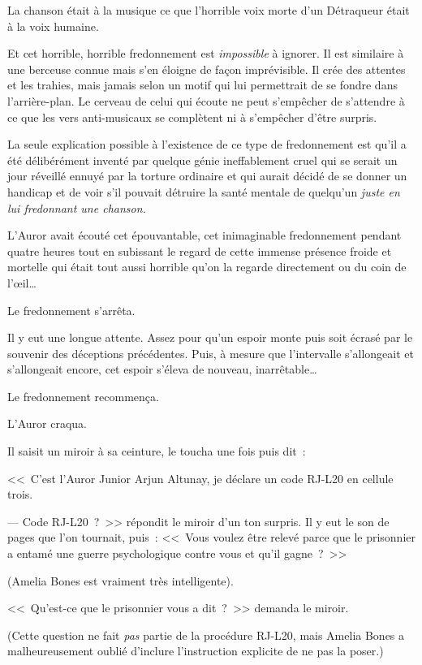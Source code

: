 La chanson était à la musique ce que l'horrible voix morte d'un Détraqueur était à la voix humaine.

Et cet horrible, horrible fredonnement est \emph{impossible} à ignorer. Il est similaire à une berceuse connue mais s'en éloigne de façon imprévisible. Il crée des attentes et les trahies, mais jamais selon un motif qui lui permettrait de se fondre dans l'arrière-plan. Le cerveau de celui qui écoute ne peut s'empêcher de s'attendre à ce que les vers anti-musicaux se complètent ni à s'empêcher d'être surpris.

La seule explication possible à l'existence de ce type de fredonnement est qu'il a été délibérément inventé par quelque génie ineffablement cruel qui se serait un jour réveillé ennuyé par la torture ordinaire et qui aurait décidé de se donner un handicap et de voir s'il pouvait détruire la santé mentale de quelqu'un \emph{juste en lui fredonnant une chanson.}

L'Auror avait écouté cet épouvantable, cet inimaginable fredonnement pendant quatre heures tout en subissant le regard de cette immense présence froide et mortelle qui était tout aussi horrible qu'on la regarde directement ou du coin de l'œil…

Le fredonnement s'arrêta.

Il y eut une longue attente. Assez pour qu'un espoir monte puis soit écrasé par le souvenir des déceptions précédentes. Puis, à mesure que l'intervalle s'allongeait et s'allongeait encore, cet espoir s'éleva de nouveau, inarrêtable…

Le fredonnement recommença.

L'Auror craqua.

Il saisit un miroir à sa ceinture, le toucha une fois puis dit~:

<<~C'est l'Auror Junior Arjun Altunay, je déclare un code RJ-L20 en cellule trois.

--- Code RJ-L20~?~>> répondit le miroir d'un ton surpris. Il y eut le son de pages que l'on tournait, puis~: <<~Vous voulez être relevé parce que le prisonnier a entamé une guerre psychologique contre vous et qu'il gagne~?~>>

(Amelia Bones est vraiment très intelligente).

<<~Qu'est-ce que le prisonnier vous a dit~?~>> demanda le miroir.

(Cette question ne fait \emph{pas} partie de la procédure RJ-L20, mais Amelia Bones a malheureusement oublié d'inclure l'instruction explicite de ne pas la poser.)

